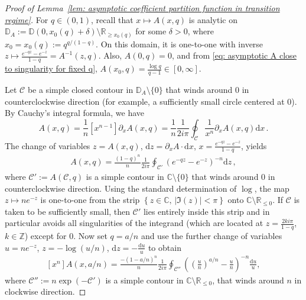\documentclass{article}
\theoremstyle{remark}
\newcommand{\bZ}{\mathbb{Z}}
\newcommand{\bR}{\mathbb{R}}
\newcommand{\bC}{\mathbb{C}}
\newcommand{\abs}[1]{{\left|#1\right|}}
\newcommand{\bD}{\mathbb{D}}
\newcommand{\cC}{\mathcal{C}}
\begin{document}
\begin{proof}[Proof of Lemma~\ref{lem: asymptotic coefficient partition function in transition regime}]
    For $q \in (0,1)$, recall that $x\mapsto A(x,q)$ is analytic on $\bD_A := \bD(0,x_0(q)+\delta) \setminus \bR_{\ge x_0(q)}$ for some $\delta>0$, where $x_0 = x_0(q):= q^{q/(1-q)}$.
    On this domain, it is one-to-one with inverse $z\mapsto \frac{e^{-qz}-e^{-z}}{1-q} = A^{-1}(z,q)$.
    Also, $A(0,q)=0$, and from \eqref{eq: asymptotic A close to singularity for fixed q}, $A(x_0,q) = \frac{\log q}{q-1} \in [0,\infty]$.
    
    Let $\cC$ be a simple closed contour in $\bD_A \setminus \{0\}$ that winds around $0$ in counterclockwise direction (for example, a sufficiently small circle centered at $0$).
    By Cauchy's integral formula, we have
    \begin{equation*}
        [x^n] A(x,q) = \frac{1}{n}[x^{n-1}] \partial_x A(x,q) 
        = \frac{1}{n} \frac{1}{2i\pi} \oint_\cC \frac{1}{x^n} \partial_x A(x,q) \mathrm{d}x \,.
    \end{equation*}
    The change of variables $z = A(x,q)$, $\mathrm{d}z = \partial_x A \cdot \mathrm{d}x$, $x = \frac{e^{-qz}-e^{-z}}{1-q}$, yields
    \begin{align*}
        [x^n] A(x,q)
        = \frac{(1-q)^n}{n} \frac{1}{2i\pi} \oint_{\cC'} \left( e^{-qz} - e^{-z} \right)^{-n} \mathrm{d}z\,,
    \end{align*}
    where $\cC' := A(\cC,q)$ is a simple contour in $\bC \setminus \{0\}$ that winds around $0$ in counterclockwise direction.
    Using the standard determination of $\log$, the map $z\mapsto ne^{-z}$ is one-to-one from the strip $\left\{ z \in \bC, \, \abs{\Im(z)} < \pi \right\}$ onto $\bC \setminus \bR_{\le0}$. If $\cC$ is taken to be sufficiently small, then $\cC'$ lies entirely inside this strip and in particular avoids all singularities of the integrand (which are located at $z = \frac{2ki\pi}{1-q}$, $k \in \bZ$) except for $0$.    
    Now set $q=a/n$ and use the further change of variables $u = ne^{-z}$, $z = -\log(u/n)$, $\mathrm{d}z = -\frac{\mathrm{d}u}{u}$ to obtain
    \begin{align}\label{eq: Cauchy contour formula for A after two changes of variables in transition regime}
        [x^n] A(x,a/n)
        = \frac{-(1-a/n)^n}{n} \frac{1}{2i\pi} \oint_{\cC''} \left( \left(\frac{u}{n}\right)^{a/n} - \frac{u}{n} \right)^{-n} \frac{\mathrm{d}u}{u},
    \end{align}
    where $\cC'' := n\exp(-\cC')$ is a simple contour in $\bC \setminus \bR_{\le0}$, that winds around $n$ in clockwise direction.

\end{proof}
\end{document}

